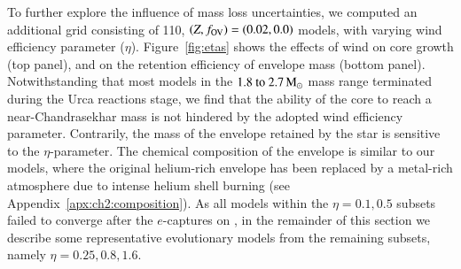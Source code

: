 \documentclass[main.tex]{subfiles}
\begin{document}
To further explore the influence of mass loss uncertainties, we computed an additional grid consisting of 110,  $(Z, f_{\rm OV})=(0.02,0.0)$ models, with varying wind efficiency parameter ($\eta$). 
Figure~\ref{fig:etas} shows the effects of wind on core growth (top panel), and on the retention efficiency of envelope mass (bottom panel). Notwithstanding that most models in the  $\numrange{1.8}{2.7}\msun$ mass range terminated during the Urca reactions stage, we find that the ability of the core to reach a near-Chandrasekhar mass is not hindered by the adopted wind efficiency parameter. Contrarily, the mass of the envelope retained by the star is sensitive to the  $\eta$-parameter. The chemical composition of the envelope is similar to our \seriesone models, where the original helium-rich envelope has been replaced by a metal-rich atmosphere due to intense helium shell burning (see Appendix~\ref{apx:ch2:composition}). As all models within the $\eta = 0.1, 0.5$ subsets failed to converge after the $e$-captures on , in the remainder of this section we describe some representative evolutionary models from the remaining subsets, namely $\eta = 0.25, 0.8, 1.6$.
\end{document}
